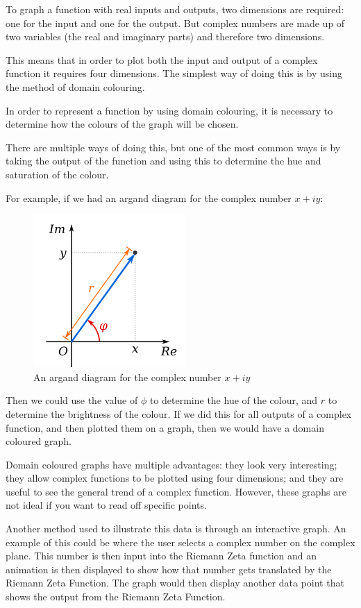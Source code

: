\documentclass{article}
\begin{document}
To graph a function with real inputs and outputs, two dimensions are required: one for the input and one for the output. But complex numbers are made up of two variables (the real and imaginary parts) and therefore two dimensions.

This means that in order to plot both the input and output of a complex function it requires four dimensions. The simplest way of doing this is by using the method of domain colouring.

In order to represent a function by using domain colouring, it is necessary to determine how the colours of the graph will be chosen.

There are multiple ways of doing this, but one of the most common ways is by taking the output of the function and using this to determine the hue and saturation of the colour.

For example, if we had an argand diagram for the complex number $x+iy$:

\begin{figure}[h]
    \centering
    \captionsetup{justification=centering}
    \includegraphics[scale=0.55]{argand-diagram}
    \caption{An argand diagram for the complex number $x+iy$}
\end{figure}

Then we could use the value of $\phi$ to determine the hue of the colour, and $r$ to determine the brightness of the colour.  If we did this for all outputs of a complex function, and then plotted them on a graph, then we would have a domain coloured graph.

Domain coloured graphs have multiple advantages: they look very interesting; they allow complex functions to be plotted using four dimensions; and they are useful to see the general trend of a complex function. However, these graphs are not ideal if you want to read off specific points.

Another method used to illustrate this data is through an interactive graph. An example of this could be where the user selects a complex number on the complex plane. This number is then input into the Riemann Zeta function and an animation is then displayed to show how that number gets translated by the Riemann Zeta Function. The graph would then display another data point that shows the output from the Riemann Zeta Function.
\end{document}
